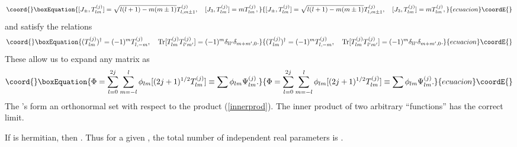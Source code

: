 \documentclass[a4paper,12pt]{article}
\numberwithin{equation}{section}
\begin{document}
\begin{equation}\coord{}\boxEquation{
[J_{\pm}, T^{(j)}_{lm}]= \sqrt{l(l+1)-m(m\pm 1)}T^{(j)}_{l,m \pm 1},
\quad [J_3, T^{(j)}_{lm}]= m T^{(j)}_{lm}, 
}{
[J_{\pm}, T^{(j)}_{lm}]= \sqrt{l(l+1)-m(m\pm 1)}T^{(j)}_{l,m \pm 1},
\quad [J_3, T^{(j)}_{lm}]= m T^{(j)}_{lm}, 
}{ecuacion}\coordE{}\end{equation} 
and satisfy the relations
\begin{equation}\coord{}\boxEquation{ 
(T^{(j)}_{lm})^{\dagger} = (-1)^m T^{(j)}_{l,-m}, \quad \text{Tr}
[T^{(j)}_{lm} T^{(j)}_{l' m'}] = (-1)^m \delta_{l l'} \delta_{m+m', 0}. 
}{ 
(T^{(j)}_{lm})^{\dagger} = (-1)^m T^{(j)}_{l,-m}, \quad \text{Tr}
[T^{(j)}_{lm} T^{(j)}_{l' m'}] = (-1)^m \delta_{l l'} \delta_{m+m', 0}. 
}{ecuacion}\coordE{}\end{equation} 
These allow us to expand any matrix \myHighlight{$\Phi$}\coordHE{} as
\begin{equation}\coord{}\boxEquation{ 
\Phi = \sum^{2j}_{l=0}\sum^{l}_{m=-l} \phi_{lm} [(2j+1)^{1/2}T^{(j)}_{lm}]
\equiv \sum \phi_{lm} \Psi^{(j)}_{lm}.
\label{modeexp}
}{ 
\Phi = \sum^{2j}_{l=0}\sum^{l}_{m=-l} \phi_{lm} [(2j+1)^{1/2}T^{(j)}_{lm}]
\equiv \sum \phi_{lm} \Psi^{(j)}_{lm}.
}{ecuacion}\coordE{}\end{equation}
The \coordHE{}'s form an orthonormal set with respect to the product
(\ref{innerprod}). The inner product of two arbitrary ``functions''
has the correct \coordHE{} limit.
 
If \myHighlight{$\Phi$}\coordHE{} is hermitian, then \coordHE{}. Thus for a given \coordHE{}, the total number of
independent real parameters is \coordHE{}.
\end{document}
